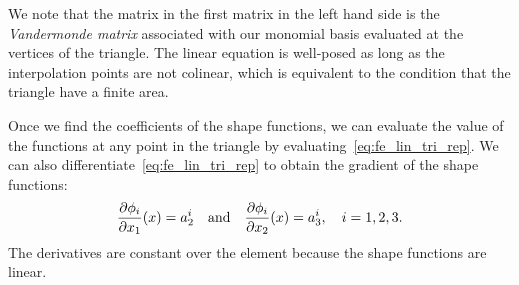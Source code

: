 We note that the matrix in the first matrix in the left hand side is the \emph{Vandermonde matrix} associated with our monomial basis evaluated at the vertices of the triangle.  The linear equation is well-posed as long as the interpolation points are not colinear, which is equivalent to the condition that the triangle have a finite area.

Once we find the coefficients of the shape functions, we can evaluate the value of the functions at any point in the triangle by evaluating~\eqref{eq:fe_lin_tri_rep}. We can also differentiate~\eqref{eq:fe_lin_tri_rep} to obtain the gradient of the shape functions:
\begin{align*}
  \frac{\partial \phi_i}{\partial x_1}(x) = a_2^i
  \quad \text{and} \quad
  \frac{\partial \phi_i}{\partial x_2}(x) = a_3^i, \quad i = 1,2,3.
\end{align*}
The derivatives are constant over the element because the shape functions are linear.

